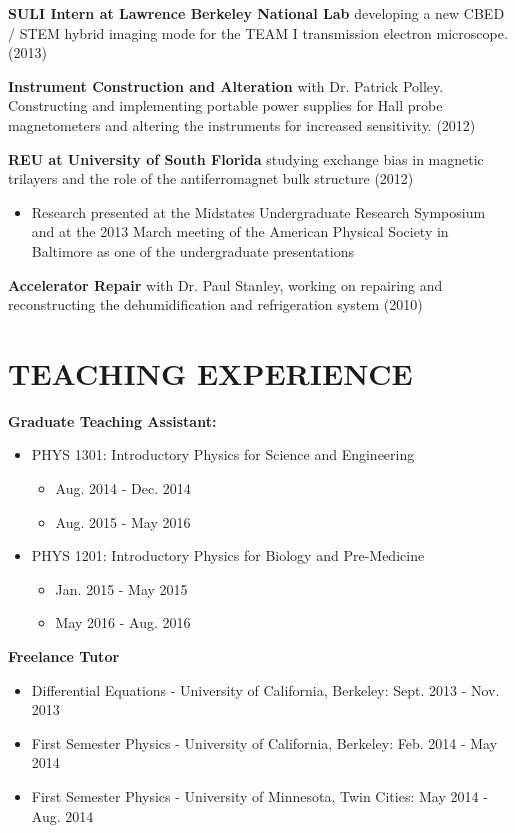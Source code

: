 \documentclass[11pt]{res}
\begin{document}
\begin{resume}
{\bf SULI Intern at Lawrence Berkeley National Lab} developing a new CBED /
	STEM hybrid imaging mode for the TEAM I transmission electron microscope.
	(2013)

{\bf Instrument Construction and Alteration} with Dr. Patrick Polley. Constructing and implementing portable power supplies for Hall probe magnetometers and altering the instruments for increased sensitivity. (2012)

{\bf REU at University of South Florida} studying exchange bias in magnetic trilayers and the role of the antiferromagnet bulk structure (2012)
	\begin{itemize}
	\item Research presented at the Midstates Undergraduate Research Symposium and at the 2013 March meeting of the American Physical Society in Baltimore as one of the undergraduate presentations
	\end{itemize} \vspace{0pt}
	
	{\bf Accelerator Repair } with Dr. Paul Stanley, working on repairing and reconstructing the dehumidification and refrigeration system (2010)\vspace{.05in}
	
	
\section{TEACHING EXPERIENCE}
	{\bf Graduate Teaching Assistant:}
	\begin{itemize}
		\item{PHYS 1301: Introductory Physics for Science and Engineering}
			\begin{itemize}
				\item{Aug. 2014 - Dec. 2014}
				\item{Aug. 2015 - May 2016}
			\end{itemize}
		\item{PHYS 1201: Introductory Physics for Biology and Pre-Medicine}
			\begin{itemize}
				\item{Jan. 2015 - May 2015}
				\item{May 2016 - Aug. 2016}
			\end{itemize}
	\end{itemize}

	{\bf Freelance Tutor}
	\begin{itemize}
		\item{Differential Equations - University of California, Berkeley: Sept. 2013 - Nov. 2013}
		\item{First Semester Physics - University of California, Berkeley: Feb. 2014 - May 2014}
		\item{First Semester Physics - University of Minnesota, Twin Cities:
			May 2014 - Aug. 2014}
	\end{itemize}


\end{resume}
\end{document}
